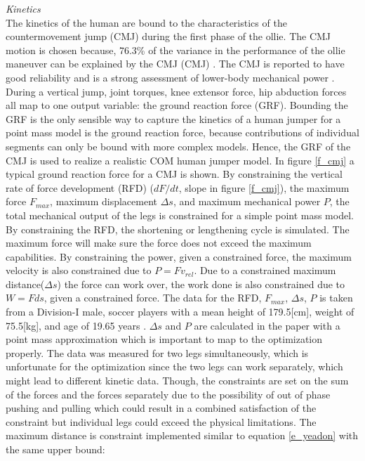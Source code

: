 \documentclass[default,iicol]{sn-jnl}
\theoremstyle{thmstyleone}%
\theoremstyle{thmstyletwo}%
\theoremstyle{thmstylethree}%
\begin{document}
\textit{Kinetics} \\
The kinetics of the human are bound to the characteristics of the countermovement jump (CMJ) during the first phase of the ollie. The CMJ motion is chosen because, 76.3\% of the variance in the performance of the ollie maneuver can be explained by the CMJ (CMJ) \cite{candotti_lower_2012}. The CMJ is reported to have good reliability and is a strong assessment of lower-body mechanical power \cite{barker_relationships_2018}. During a vertical jump, joint torques, knee extensor force, hip abduction forces all map to one output variable: the ground reaction force (GRF). Bounding the GRF is the only sensible way to capture the kinetics of a human jumper for a point mass model is the ground reaction force, because contributions of individual segments can only be bound with more complex models. Hence, the GRF of the CMJ is used to realize a realistic COM human jumper model. In figure \ref{f_cmj} a typical ground reaction force for a CMJ is shown. By constraining the vertical rate of force development (RFD) ($dF/dt$, slope in figure \ref{f_cmj}), the maximum force $F_{max}$, maximum displacement $\Delta s$, and maximum mechanical power $P$, the total mechanical output of the legs is constrained for a simple point mass model. By constraining the RFD, the shortening or lengthening cycle is simulated. The maximum force will make sure the force does not exceed the maximum capabilities. By constraining the power, given a constrained force, the maximum velocity is also constrained due to $P = F v_{rel}$.
Due to a constrained maximum distance($ \Delta s $) the force can work over, the work done is also constrained due to $ W = F ds $, given a constrained force. The data for the RFD, $ F_{max} $, $ \Delta s $, $ P $ is taken from a Division-I male, soccer players with a mean height of 179.5[cm], weight of 75.5[kg], and age of 19.65 years \cite{barker_relationships_2018}. $ \Delta s $ and $ P $ are calculated in the paper with a point mass approximation which is important to map to the optimization properly. The data was measured for two legs simultaneously, which is unfortunate for the optimization since the two legs can work separately, which might lead to different kinetic data. Though, the constraints are set on the sum of the forces and the forces separately due to the possibility of out of phase pushing and pulling which could result in a combined satisfaction of the constraint but individual legs could exceed the physical limitations. The maximum distance is constraint implemented similar to equation \ref{e_yeadon} with the same upper bound:
\end{document}
